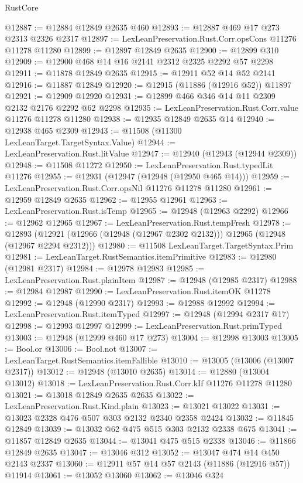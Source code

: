\begin{lexlean}{RustCore}
\begin{coremodule}
@12887 := @12884 @12849 @2635 @460
@12893 := @12887 @469 @17 @273 @2313 @2326 @2317
@12897 := LexLeanPreservation.Rust.Corr.opsCons @11276 @11278 @11280
@12899 := @12897 @12849 @2635
@12900 := @12899 @310
@12909 := @12900 @468 @14 @16 @2141 @2312 @2325 @2292 @57 @2298
@12911 := @11878 @12849 @2635
@12915 := @12911 @52 @14 @52 @2141
@12916 := @11887 @12849
@12920 := @12915 (@11886 (@12916 @52)) @11897
@12921 := @12909 @12920
@12931 := @12899 @466 @346 @14 @11 @2309 @2132 @2176 @2292 @62 @2298
@12935 := LexLeanPreservation.Rust.Corr.value @11276 @11278 @11280
@12938 := @12935 @12849 @2635 @14
@12940 := @12938 @465 @2309
@12943 := @11508 (@11300 LexLeanTarget.TargetSyntax.Value)
@12944 := LexLeanPreservation.Rust.litValue
@12947 := @12940 (@12943 (@12944 @2309))
@12948 := @11508 @11272
@12950 := LexLeanPreservation.Rust.typedLit @11276
@12955 := @12931 (@12947 (@12948 (@12950 @465 @14)))
@12959 := LexLeanPreservation.Rust.Corr.opsNil @11276 @11278 @11280
@12961 := @12959 @12849 @2635
@12962 := @12955 @12961
@12963 := LexLeanPreservation.Rust.isTemp
@12965 := @12948 (@12963 @2292)
@12966 := @12962 @12965
@12967 := LexLeanPreservation.Rust.tempFresh
@12978 := @12893
    (@12921 (@12966 (@12948 (@12967 @2302 @2132))) @12965 (@12948 (@12967 @2294 @2312)))
@12980 := @11508 LexLeanTarget.TargetSyntax.Prim
@12981 := LexLeanTarget.RustSemantics.itemPrimitive
@12983 := @12980 (@12981 @2317)
@12984 := @12978 @12983
@12985 := LexLeanPreservation.Rust.plainItem
@12987 := @12948 (@12985 @2317)
@12988 := @12984 @12987
@12990 := LexLeanPreservation.Rust.itemOK @11278
@12992 := @12948 (@12990 @2317)
@12993 := @12988 @12992
@12994 := LexLeanPreservation.Rust.itemTyped
@12997 := @12948 (@12994 @2317 @17)
@12998 := @12993 @12997
@12999 := LexLeanPreservation.Rust.primTyped
@13003 := @12948 (@12999 @460 @17 @273)
@13004 := @12998 @13003
@13005 := Bool.or
@13006 := Bool.not
@13007 := LexLeanTarget.RustSemantics.itemFallible
@13010 := @13005 (@13006 (@13007 @2317))
@13012 := @12948 (@13010 @2635)
@13014 := @12880 (@13004 @13012)
@13018 := LexLeanPreservation.Rust.Corr.kIf @11276 @11278 @11280
@13021 := @13018 @12849 @2635 @2635
@13022 := LexLeanPreservation.Rust.Kind.plain
@13023 := @13021 @13022
@13031 := @13023 @2328 @476 @507 @303 @2132 @2340 @2358 @2424
@13032 := @11845 @12849
@13039 := @13032 @62 @475 @515 @303 @2132 @2338 @675
@13041 := @11857 @12849 @2635
@13044 := @13041 @475 @515 @2338
@13046 := @11866 @12849 @2635
@13047 := @13046 @312
@13052 := @13047 @474 @14 @450 @2143 @2337
@13060 := @12911 @57 @14 @57 @2143 (@11886 (@12916 @57)) @11914
@13061 := @13052 @13060
@13062 := @13046 @324

\end{coremodule}
\end{lexlean}
